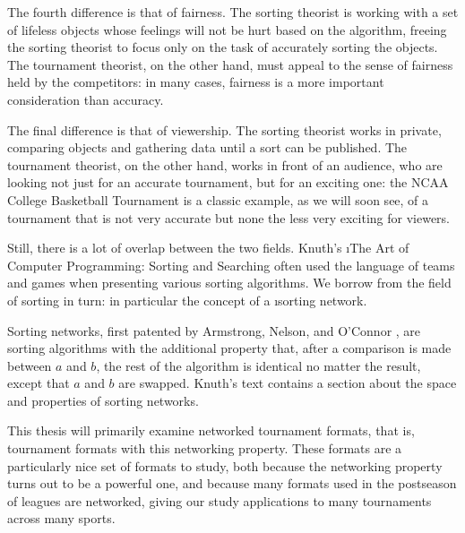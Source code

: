 {    The fourth difference is that of fairness. The sorting theorist is working with a set of lifeless objects whose feelings will not be hurt based on the algorithm, freeing the sorting theorist to focus only on the task of accurately sorting the objects. The tournament theorist, on the other hand, must appeal to the sense of fairness held by the competitors: in many cases, fairness is a more important consideration than accuracy. 
    
    The final difference is that of viewership. The sorting theorist works in private, comparing objects and gathering data until a sort can be published. The tournament theorist, on the other hand, works in front of an audience, who are looking not just for an accurate tournament, but for an exciting one: the NCAA College Basketball Tournament is a classic example, as we will soon see, of a tournament that is not very accurate but none the less very exciting for viewers.

    Still, there is a lot of overlap between the two fields. Knuth's \i{The Art of Computer Programming: Sorting and Searching} \cite{knuth} often used the language of teams and games when presenting various sorting algorithms. We borrow from the field of sorting in turn: in particular the concept of a \i{sorting network}.

    Sorting networks, first patented by Armstrong, Nelson, and O'Connor \cite{pat}, are sorting algorithms with the additional property that, after a comparison is made between $a$ and $b$, the rest of the algorithm is identical no matter the result, except that $a$ and $b$ are swapped. Knuth's text contains a section about the space and properties of sorting networks.

    This thesis will primarily examine networked tournament formats, that is, tournament formats with this networking property. These formats are a particularly nice set of formats to study, both because the networking property turns out to be a powerful one, and because many formats used in the postseason of leagues are networked, giving our study applications to many tournaments across many sports.
}



